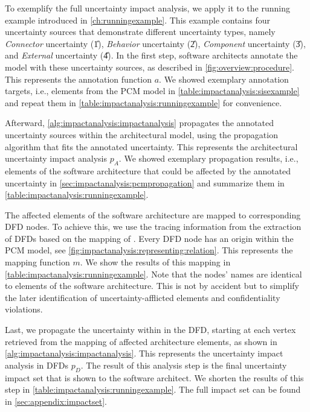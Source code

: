 To exemplify the full uncertainty impact analysis, we apply it to the running example introduced in \autoref{ch:runningexample}.
This example contains four uncertainty sources that demonstrate different uncertainty types, namely \emph{Connector} uncertainty (\U{1}), \emph{Behavior} uncertainty (\U{2}), \emph{Component} uncertainty (\U{3}), and \emph{External} uncertainty (\U{4}).
In the first step, software architects annotate the model with these uncertainty sources, as described in \autoref{fig:overview:procedure}.
This represents the annotation function $a$.
We showed exemplary annotation targets, i.e., elements from the \ac{PCM} model in \autoref{table:impactanalysis:sisexample} and repeat them in \autoref{table:impactanalysis:runningexample} for convenience.

Afterward, \autoref{alg:impactanalysis:impactanalysis} propagates the annotated uncertainty sources within the architectural model, using the propagation algorithm that fits the annotated uncertainty.
This represents the architectural uncertainty impact analysis $p_{A}$.
We showed exemplary propagation results, i.e., elements of the software architecture that could be affected by the annotated uncertainty in \autoref{sec:impactanalysis:pcmpropagation} and summarize them in \autoref{table:impactanalysis:runningexample}.

The affected elements of the software architecture are mapped to corresponding \ac{DFD} nodes.
To achieve this, we use the tracing information from the extraction of \acp{DFD} based on the mapping of \textcite{seifermann_architectural_2022}.
Every \ac{DFD} node has an origin within the \ac{PCM} model, see \autoref{fig:impactanalysis:representing:relation}.
This represents the mapping function $m$.
We show the results of this mapping in \autoref{table:impactanalysis:runningexample}.
Note that the nodes' names are identical to elements of the software architecture.
This is not by accident but to simplify the later identification of uncertainty-afflicted elements and confidentiality violations.

Last, we propagate the uncertainty within in the \ac{DFD}, starting at each vertex retrieved from the mapping of affected architecture elements, as shown in \autoref{alg:impactanalysis:impactanalysis}.
This represents the uncertainty impact analysis in \acp{DFD} $p_{D}$.
The result of this analysis step is the final uncertainty impact set that is shown to the software architect.
We shorten the results of this step in \autoref{table:impactanalysis:runningexample}.
The full impact set can be found in \autoref{sec:appendix:impactset}.


